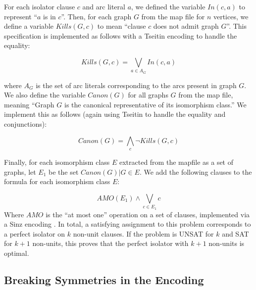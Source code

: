\documentclass[a4paper,UKenglish,cleveref, autoref, thm-restate]{lipics-v2021}
\begin{document}
For each isolator clause $c$ and arc literal $a$, we defined the variable $In(c, a)$ to represent ``$a$ is in $c$''. Then, for each graph $G$ from the map file for $n$ vertices, we define a variable $Kills(G,c)$ to mean ``clause $c$ does not admit graph $G$''. This specification is implemented as follows with a Tseitin encoding \cite{ref_tseitin} to handle the equality:

\begin{equation}
Kills(G,c) = \bigvee\limits_{a \in A_G}In(c, a)
\end{equation}

where $A_G$ is the set of arc literals corresponding to the arcs present in graph $G$. We also define the variable $Canon(G)$ for all graphs $G$ from the map file, meaning ``Graph $G$ is the canonical representative of its isomorphism class.'' We implement this as follows (again using Tseitin to handle the equality and conjunctions):

\begin{equation}
    Canon(G) = \bigwedge\limits_c \lnot Kills(G,c)
\end{equation}

Finally, for each isomorphism class $E$ extracted from the mapfile as a set of graphs, let $E_1$ be the set ${Canon(G) | G \in E}$. We add the following clauses to the formula for each isomorphism class $E$:

\begin{equation}
 AMO(E_1) \land \bigvee\limits_{c \in E_1} c
\end{equation}
Where $AMO$ is the ``at most one'' operation on a set of clauses, implemented via a Sinz encoding \cite{ref_sinz}. In total, a satisfying assignment to this problem corresponds to a perfect isolator on $k$ non-unit clauses. If the problem is UNSAT for $k$ and SAT for $k+1$ non-units, this proves that the perfect isolator with $k+1$ non-units is optimal.


\subsection{Breaking Symmetries in the Encoding}
\end{document}
